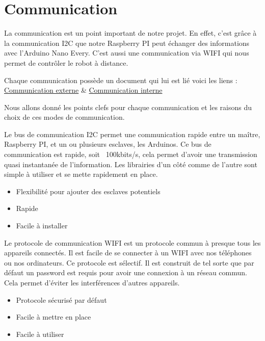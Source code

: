 \documentclass[
	a4paper,									%
	11pt,										%
	twoside,									%
	openright,									%
	notitlepage,									%
	parskip=half,								%
]{scrreprt}										%
\begin{document}
\section{Communication}

La communication est un point important de notre projet. En effet, c'est grâce à la communication I2C que notre Raspberry PI peut 
échanger des informations avec l'Arduino Nano Every. C'est aussi une communication via WIFI qui nous permet de contrôler le robot 
à distance. \par

Chaque communication possède un document qui lui est lié voici les liens : \href{run:./Comm_Externe}{Communication externe} \&
\href{run:./Comm_interne}{Communication interne} \par

Nous allons donné les points clefs pour chaque communication et les raisons du choix de ces modes de communication. \par

Le bus de communication I2C permet une communication rapide entre un maître, Raspberry PI, et un ou plusieurs esclaves, les Arduinos. 
Ce bus de communication est rapide, soit ~100kbits/s, cela permet d'avoir une transmission quasi instantanée de l'information.
Les librairies d'un côté comme de l'autre sont simple à utiliser et se mette rapidement en place. 

\begin{itemize}
	\item Flexibilité pour ajouter des esclaves potentiels
	\item Rapide
	\item Facile à installer
\end{itemize}

Le protocole de communication WIFI est un protocole commun à presque tous les appareils connectés. Il est facile de se connecter 
à un WIFI avec nos téléphones ou nos ordinateurs. Ce protocole est sélectif. Il est construit de tel sorte que par défaut un 
password est requis pour avoir une connexion à un réseau commun. Cela permet d'éviter les interférences d'autres appareils. 

\begin{itemize}
	\item Protocole sécurisé par défaut 
	\item Facile à mettre en place
	\item Facile à utiliser
\end{itemize}
\end{document}
